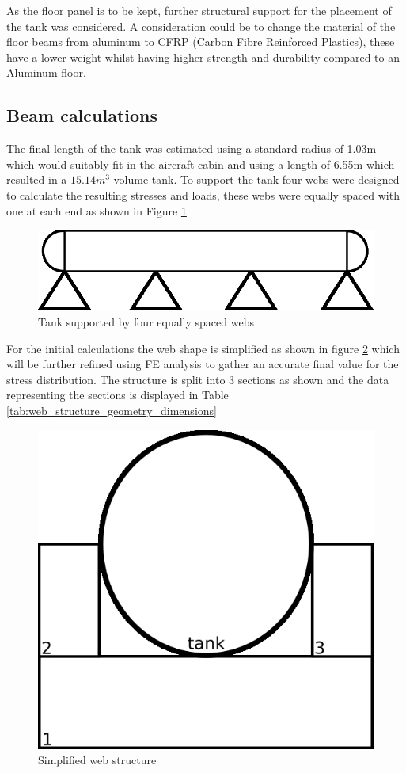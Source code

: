 As the floor panel is to be kept, further structural support for the placement of the tank was considered. A consideration could be to change the material of the floor beams from aluminum to CFRP (Carbon Fibre Reinforced Plastics), these have a lower weight whilst having higher strength and durability compared to an Aluminum floor. 

\subsection{Beam calculations}
The final length of the tank was estimated using a standard radius of 1.03m which would suitably fit in the aircraft cabin and using a length of 6.55m which resulted in a $15.14 m^3$ volume tank. To support the tank four webs were designed to calculate the resulting stresses and loads, these webs were equally spaced with one at each end as shown in Figure \ref{fig:tank_equal_webs}


\begin{figure}[!htbp]
\centering
\includegraphics[width= 0.8\linewidth]{../figures/tank_equal_webs.jpg}
\caption{Tank supported by four equally spaced webs}
  \label{fig:tank_equal_webs}
\end{figure}
\FloatBarrier

For the initial calculations the web shape is simplified as shown in figure \ref{fig:simplified_web_structure} which will be further refined using FE analysis to gather an accurate final value for the stress distribution. The structure is split into 3 sections as shown and the data representing the sections is displayed in Table \ref{tab:web_structure_geometry_dimensions}


\begin{figure}[!htbp]
\centering
\includegraphics[width= 0.6\linewidth]{../figures/simplified_web_structure.jpg}
\caption{Simplified web structure}
  \label{fig:simplified_web_structure}
\end{figure}
\FloatBarrier

